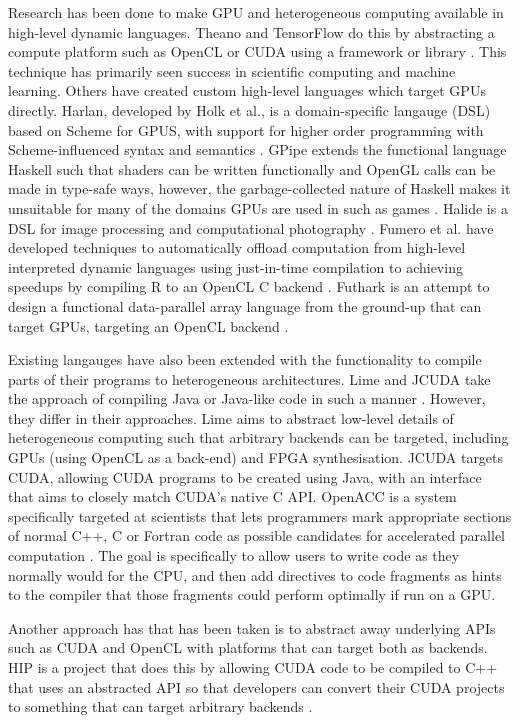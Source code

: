 \documentclass[a4paper,12pt,twoside,openright]{report}
\begin{document}
Research has been done to make GPU and heterogeneous computing available in
high-level dynamic languages. Theano and TensorFlow do this by abstracting a
compute platform such as OpenCL or CUDA using a framework or library
\cite{Theano2016} \cite{TensorFlowWhitePaper}. This technique has primarily
seen success in scientific computing and machine learning. Others have created
custom high-level languages which target GPUs directly. Harlan, developed by
Holk et al., is a domain-specific langauge (DSL) based on Scheme for GPUS, with
support for higher order programming with Scheme-influenced syntax and
semantics \cite{Harlan} \cite{HarlanAnnouncement}. GPipe extends the functional
language Haskell such that shaders can be written functionally and OpenGL calls
can be made in type-safe ways, however, the garbage-collected nature of Haskell
makes it unsuitable for many of the domains GPUs are used in such as games
\cite{HaskellState} \cite{GPipe}. Halide is a DSL for image processing and
computational photography \cite{Halide}. Fumero et al. have developed
techniques to automatically offload computation from high-level interpreted
dynamic languages using just-in-time compilation to achieving speedups by
compiling R to an OpenCL C backend \cite{JITGPU}. Futhark is an attempt to
design a functional data-parallel array language from the ground-up that can
target GPUs, targeting an OpenCL backend \cite{Futhark}.

Existing langauges have also been extended with the functionality to compile
parts of their programs to heterogeneous architectures. Lime and JCUDA take the
approach of compiling Java or Java-like code in such a manner \cite{Lime2010}
\cite{Lime2012} \cite{JCUDA2009}. However, they differ in their approaches.
Lime aims to abstract low-level details of heterogeneous computing such that
arbitrary backends can be targeted, including GPUs (using OpenCL as a back-end)
and FPGA synthesisation. JCUDA targets CUDA, allowing CUDA programs to be
created using Java, with an interface that aims to closely match CUDA's native
C API. OpenACC is a system specifically targeted at scientists that lets
programmers mark appropriate sections of normal C++, C or Fortran code as
possible candidates for accelerated parallel computation \cite{OpenACC}. The
goal is specifically to allow users to write code as they normally would for
the CPU, and then add directives to code fragments as hints to the compiler
that those fragments could perform optimally if run on a GPU.

Another approach has that has been taken is to abstract away underlying APIs
such as CUDA and OpenCL with platforms that can target both as backends. HIP is
a project that does this by allowing CUDA code to be compiled to C++ that uses
an abstracted API so that developers can convert their CUDA projects to
something that can target arbitrary backends \cite{HIP}.
\end{document}
